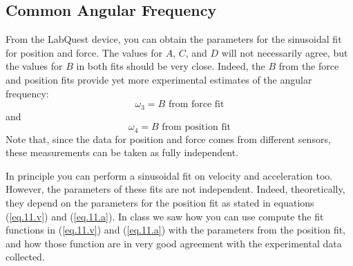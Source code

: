 \subsection{Common Angular Frequency}
From the LabQuest device, you can obtain the parameters for the sinusoidal fit for position and force. The values for $A$, $C$, and $D$ will not necessarily agree, but the values for $B$ in both fits should be very close. Indeed, the $B$ from the force and position fits provide yet more experimental estimates of the angular frequency:
\begin{equation}
    \omega_{3} = B \text{ from force fit}
\end{equation}
and
\begin{equation}
    \omega_{4} = B \text{ from position fit}
\end{equation}
Note that, since the data for position and force comes from different sensors, these measurements can be taken as fully independent.

In principle you can perform a sinusoidal fit on velocity and acceleration too. However, the parameters of these fits are not independent. Indeed, theoretically, they depend on the parameters for the position fit as stated in equations (\ref{eq.11.v}) and (\ref{eq.11.a}). In class we saw how you can use compute the fit functions in (\ref{eq.11.v}) and (\ref{eq.11.a}) with the parameters from the position fit, and how those function are in very good agreement with the experimental data collected.

